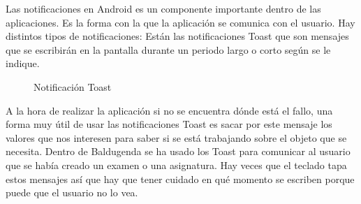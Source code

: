Las notificaciones en Android es un componente importante dentro de las aplicaciones. Es la forma con la que la aplicación se comunica con el usuario.
Hay distintos tipos de notificaciones:
Están las notificaciones Toast que son mensajes que se escribirán en la pantalla durante un periodo largo o corto según se le indique.
\newpage
\begin{figure}[H] 
  \begin{center} 
    \caption{Notificación Toast} 
    \label{fig:NotificacionToast} 
  \end{center} 
\end{figure}

A la hora de realizar la aplicación si no se encuentra dónde está el fallo, una forma muy útil de usar las notificaciones Toast es sacar por este mensaje los valores que nos interesen para saber si se está trabajando sobre el objeto que se necesita.
Dentro de Baldugenda se ha usado los Toast para comunicar al usuario que se había creado un examen o una asignatura. Hay veces que el teclado tapa estos mensajes así que hay que tener cuidado en qué momento se escriben porque puede que el usuario no lo vea.

